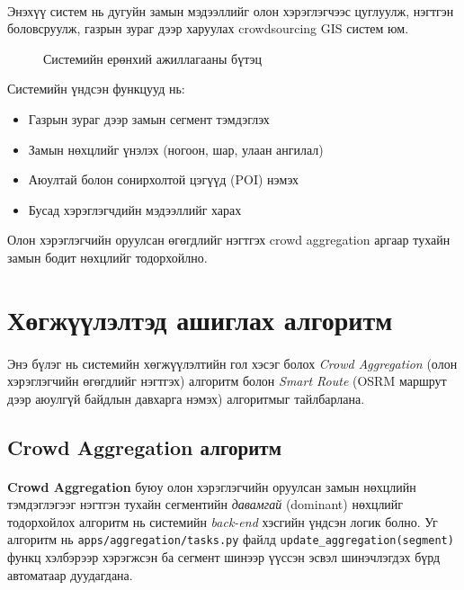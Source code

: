 \paragraph{}
Энэхүү систем нь дугуйн замын мэдээллийг олон хэрэглэгчээс цуглуулж, нэгтгэн боловсруулж, газрын зураг дээр харуулах crowdsourcing GIS систем юм.
\begin{figure}[H]
    \centering
    \caption{Системийн ерөнхий ажиллагааны бүтэц}
    \label{fig:system}
\end{figure}
Системийн үндсэн функцууд нь:
\begin{itemize}
    \item Газрын зураг дээр замын сегмент тэмдэглэх
    \item Замын нөхцлийг үнэлэх (ногоон, шар, улаан ангилал)
    \item Аюултай болон сонирхолтой цэгүүд (POI) нэмэх
    \item Бусад хэрэглэгчдийн мэдээллийг харах
\end{itemize}
Олон хэрэглэгчийн оруулсан өгөгдлийг нэгтгэх crowd aggregation аргаар тухайн замын бодит нөхцлийг тодорхойлно.
\section{Хөгжүүлэлтэд ашиглах алгоритм}
\paragraph{} Энэ бүлэг нь системийн хөгжүүлэлтийн гол хэсэг болох \textit{Crowd Aggregation} (олон хэрэглэгчийн өгөгдлийг нэгтгэх) алгоритм болон \textit{Smart Route} (OSRM маршрут дээр аюулгүй байдлын давхарга нэмэх) алгоритмыг тайлбарлана.
\subsection{Crowd Aggregation алгоритм}
\paragraph{}
\textbf{Crowd Aggregation} буюу олон хэрэглэгчийн оруулсан замын нөхцлийн тэмдэглэгээг нэгтгэн тухайн сегментийн \emph{давамгай} (dominant) нөхцлийг тодорхойлох алгоритм нь системийн \textit{back-end} хэсгийн үндсэн логик болно. Уг алгоритм нь \texttt{apps/aggregation/tasks.py} файлд \texttt{update\_aggregation(segment)} функц хэлбэрээр хэрэгжсэн ба сегмент шинээр үүссэн эсвэл шинэчлэгдэх бүрд автоматаар дуудагдана.

